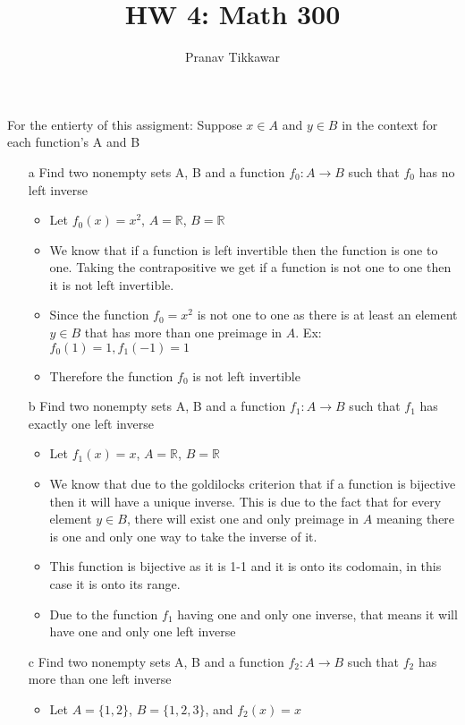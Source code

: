 \documentclass{article}
\author{Pranav Tikkawar}
\title{HW 4: Math 300}
\begin{document}
\maketitle
For the entierty of this assigment: Suppose $x \in A$ and $y \in B$ in the context for each function's A and B
\begin{enumerate}
    \item [a] Find two nonempty sets A, B and a function $f_0 : A \rightarrow B$ such that $f_0$ has no left
    inverse \begin{itemize}
        \item Let $f_0(x) = x^2$, $A = \mathbb{R}$, $ B =\mathbb{R} $
        \item We know that if a function is left invertible then the function is one to one. Taking the contrapositive we get if a function is not one to one then it is not left invertible.
        \item Since the function $f_0 = x^2$ is not one to one as there is at least an element $y \in B$ that has more than one preimage in $A$. Ex: $f_0(1) = 1 , f_1(-1) = 1 $
        \item Therefore the function $f_0$ is not left invertible
    \end{itemize}
    \item [b] Find two nonempty sets A, B and a function $f_1 : A \rightarrow B$ such that $f_1$ has exactly one
    left inverse \begin{itemize}
        \item Let $f_1(x) = x$, $A = \mathbb{R}$, $ B =\mathbb{R} $
        \item We know that due to the goldilocks criterion that if a function is bijective then it will have a unique inverse. This is due to the fact that for every element $y \in B $, there will exist one and only preimage in $A$ meaning there is one and only one way to take the inverse of it. 
        \item This function is bijective as it is 1-1 and it is onto its codomain, in this case it is onto its range. 
        \item Due to the function $f_1$ having one and only one inverse, that means it will have one and only one left inverse
    \end{itemize}
    \item [c] Find two nonempty sets A, B and a function $f_2 : A \rightarrow B$ such that $f_2$ has more than
    one left inverse \begin{itemize}
        \item Let $A = \{1,2\}$, $B = \{1,2,3\}$, and $f_2(x) = x$

\end{itemize}
\end{enumerate}
\end{document}
